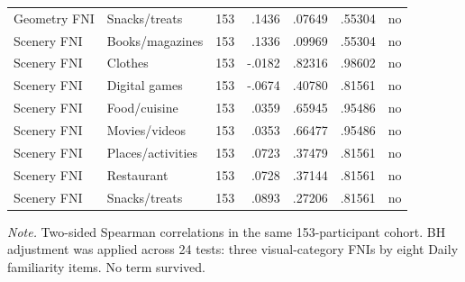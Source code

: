 \begin{longtable}{@{}>{\raggedright\arraybackslash}p{2.6cm}>{\raggedright\arraybackslash}p{3.0cm}rrrrr@{}}
Geometry FNI & Snacks/treats & 153 & .1436 & .07649 & .55304 & no \\
Scenery FNI & Books/magazines & 153 & .1336 & .09969 & .55304 & no \\
Scenery FNI & Clothes & 153 & -.0182 & .82316 & .98602 & no \\
Scenery FNI & Digital games & 153 & -.0674 & .40780 & .81561 & no \\
Scenery FNI & Food/cuisine & 153 & .0359 & .65945 & .95486 & no \\
Scenery FNI & Movies/videos & 153 & .0353 & .66477 & .95486 & no \\
Scenery FNI & Places/activities & 153 & .0723 & .37479 & .81561 & no \\
Scenery FNI & Restaurant & 153 & .0728 & .37144 & .81561 & no \\
Scenery FNI & Snacks/treats & 153 & .0893 & .27206 & .81561 & no \\
\end{longtable}
\noindent\begin{minipage}{\textwidth}\footnotesize\textit{Note.} Two-sided Spearman correlations in the same 153-participant cohort. BH adjustment was applied across 24 tests: three visual-category FNIs by eight Daily familiarity items. No term survived.\end{minipage}
\endgroup
